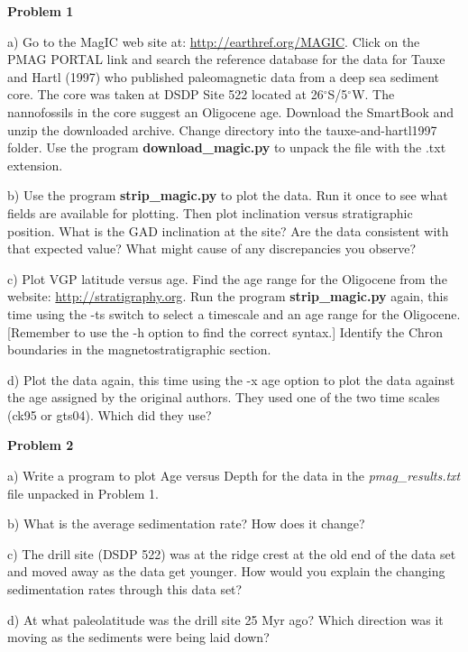 {\parindent 0pt  \parskip 6pt

{\bf Problem 1 }

a) Go to the MagIC web site at: \url{http://earthref.org/MAGIC}.  Click on the PMAG PORTAL
link and search the reference database for the data for Tauxe and Hartl (1997) \nocite{tauxe97} who published paleomagnetic data from a deep sea sediment core.   The core was taken at DSDP Site 522 located at  26$^{\circ}$S/5$^{\circ}$W.  The nannofossils in the core suggest an Oligocene age.   Download the SmartBook and unzip the downloaded archive.  Change directory into the tauxe-and-hartl1997 folder.   Use the program {\bf download\_magic.py} to unpack the file with the .txt extension.  

b) Use the program {\bf strip\_magic.py} to plot the data.  Run it once to see what fields are  available for plotting.  Then plot inclination versus stratigraphic position.  
 What is the GAD inclination at the site?    Are the data consistent with that expected value?   What might cause of any discrepancies you observe?    

c) Plot VGP latitude versus age.  
 Find the age range for the Oligocene from the website: \url{http://stratigraphy.org}.  Run the program {\bf strip\_magic.py} again, this time using the -ts switch to select a timescale and an age range for the Oligocene. [Remember to use the -h option to find the correct syntax.]     Identify the Chron boundaries in the magnetostratigraphic section.   

d) Plot the data again, this time using the -x age option to plot the data against the age assigned by the original authors.   They used one of the two time scales (ck95 or gts04).  Which did they use?  

{\bf Problem 2}

a) Write a program to plot Age versus Depth for the data in the {\it pmag\_results.txt} file unpacked  in Problem 1.  

b) What is the average sedimentation rate?  How does it change? 

c) The drill site (DSDP 522) was at the ridge crest  at the old end of the data set and moved away as the data get younger.  How would you explain the changing sedimentation rates through this data set? 

d) At what paleolatitude was the drill site 25 Myr ago?  Which direction was it moving as the sediments were being laid down?  


}

